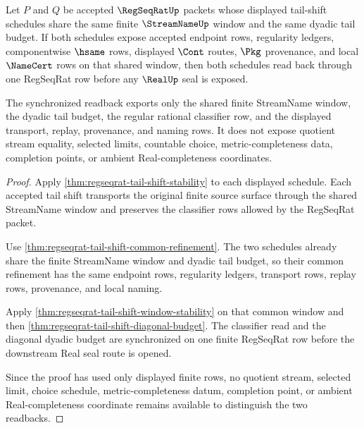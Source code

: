 \begin{theorem}
\label{thm:regseqrat-tail-shift-synchronized-readback}
Let $P$ and $Q$ be accepted $\RegSeqRatUp$ packets whose displayed tail-shift
schedules share the same finite $\StreamNameUp$ window and the same dyadic
tail budget. If both schedules expose accepted endpoint rows, regularity
ledgers, componentwise $\hsame$ rows, displayed $\Cont$ routes, $\Pkg$
provenance, and local $\NameCert$ rows on that shared window, then both
schedules read back through one RegSeqRat row before any $\RealUp$ seal is
exposed.

The synchronized readback exports only the shared finite StreamName window,
the dyadic tail budget, the regular rational classifier row, and the displayed
transport, replay, provenance, and naming rows. It does not expose quotient
stream equality, selected limits, countable choice, metric-completeness data,
completion points, or ambient Real-completeness coordinates.
\end{theorem}
\begin{proof}
Apply \autoref{thm:regseqrat-tail-shift-stability} to each displayed schedule.
Each accepted tail shift transports the original finite source surface through
the shared StreamName window and preserves the classifier rows allowed by the
RegSeqRat packet.

Use \autoref{thm:regseqrat-tail-shift-common-refinement}. The two schedules
already share the finite StreamName window and dyadic tail budget, so their
common refinement has the same endpoint rows, regularity ledgers, transport
rows, replay rows, provenance, and local naming.

Apply \autoref{thm:regseqrat-tail-shift-window-stability} on that common
window and then \autoref{thm:regseqrat-tail-shift-diagonal-budget}. The
classifier read and the diagonal dyadic budget are synchronized on one finite
RegSeqRat row before the downstream Real seal route is opened.

Since the proof has used only displayed finite rows, no quotient stream,
selected limit, choice schedule, metric-completeness datum, completion point,
or ambient Real-completeness coordinate remains available to distinguish the
two readbacks.
\end{proof}

